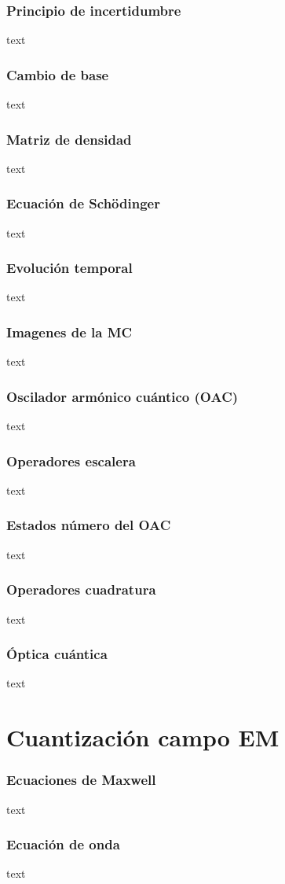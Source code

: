 \documentclass[xcolor=dvipsnames,slidestop,compress,mathserif, 11pt]{beamer}
\begin{document}
\begin{frame}[c]
	\frametitle{Principio de incertidumbre}
	text
\end{frame}

\begin{frame}[c]
	\frametitle{Cambio de base}
	text
\end{frame}

\begin{frame}[c]
	\frametitle{Matriz de densidad}
	text
\end{frame}

\begin{frame}[c]
	\frametitle{Ecuación de Schödinger}
	text
\end{frame}

\begin{frame}[c]
	\frametitle{Evolución temporal}
	text
\end{frame}

\begin{frame}[c]
	\frametitle{Imagenes de la MC}
	text
\end{frame}

\begin{frame}[c]
	\frametitle{Oscilador armónico cuántico (OAC)}
	text
\end{frame}

\begin{frame}[c]
	\frametitle{Operadores escalera}
	text
\end{frame}

\begin{frame}[c]
	\frametitle{Estados número del OAC}
	text
\end{frame}

\begin{frame}[c]
	\frametitle{Operadores cuadratura}
	text
\end{frame}

\begin{frame}[c]
	\frametitle{Óptica cuántica}
	text
\end{frame}

\section{Cuantización campo EM}

\begin{frame}[c]
	\frametitle{Ecuaciones de Maxwell}
	text
\end{frame}

\begin{frame}[c]
	\frametitle{Ecuación de onda}
	text
\end{frame}
\end{document}
